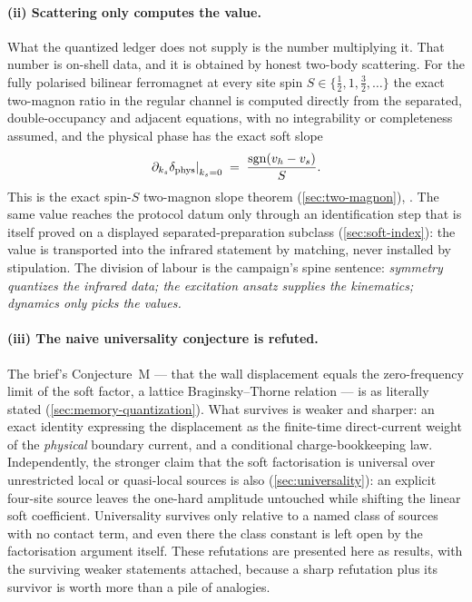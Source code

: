 \paragraph{(ii) Scattering only computes the value.}
What the quantized ledger does not supply is the number multiplying it. That
number is on-shell data, and it is obtained by honest two-body scattering.
For the fully polarised bilinear ferromagnet at every site spin
$S\in\{\tfrac12,1,\tfrac32,\dots\}$ the exact two-magnon ratio in the regular
channel is computed directly from the separated, double-occupancy and
adjacent equations, with no integrability or completeness assumed, and the
physical phase has the exact soft slope
\begin{equation}
  \left.\partial_{k_s}\delta_{\mathrm{phys}}\right|_{k_s=0}
  \;=\;\frac{\operatorname{sgn}(v_h-v_s)}{S}.
  \label{eq:ov-slope}
\end{equation}
This is the exact spin-$S$ two-magnon slope theorem (\cref{sec:two-magnon}),
\statusProved. The same value reaches the protocol datum only through an
identification step that is itself proved on a displayed
separated-preparation subclass (\cref{sec:soft-index}): the value is
transported into the infrared statement by matching, never installed by
stipulation. The division of labour is the campaign's spine sentence:
\emph{symmetry quantizes the infrared data; the excitation ansatz supplies
the kinematics; dynamics only picks the values.}

\paragraph{(iii) The naive universality conjecture is refuted.}
The brief's Conjecture~M --- that the wall displacement equals the
zero-frequency limit of the soft factor, a lattice Braginsky--Thorne relation
--- is \statusRefuted{} as literally stated (\cref{sec:memory-quantization}).
What survives is weaker and sharper: an exact identity expressing the
displacement as the finite-time direct-current weight of the \emph{physical}
boundary current, and a conditional charge-bookkeeping law. Independently,
the stronger claim that the soft factorisation is universal over unrestricted
local or quasi-local sources is also \statusRefuted{}
(\cref{sec:universality}): an explicit four-site source leaves the one-hard
amplitude untouched while shifting the linear soft coefficient. Universality
survives only relative to a named class of sources with no contact term, and
even there the class constant is left open by the factorisation argument
itself. These refutations are presented here as results, with the surviving
weaker statements attached, because a sharp refutation plus its survivor is
worth more than a pile of analogies.

